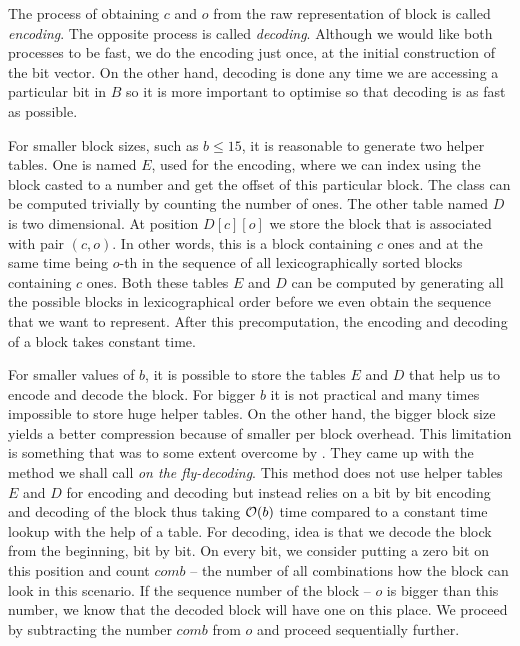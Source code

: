 The process of obtaining $c$ and $o$ from the raw representation of block is called
\textit{encoding}. The opposite process is called \textit{decoding}. Although we would
like both processes to be fast, we do the encoding just once, at the initial construction
of the bit vector. On the other hand, decoding is done any time we are accessing a particular
bit in $B$ so it is more important to optimise so that decoding is as fast as possible.

For smaller block sizes, such as $b\leq 15$, it is reasonable to
generate two helper tables. One is named $E$, used for the encoding, where we can
index using the block casted to a number and get the offset of this particular block.
The class can be computed trivially by counting the number of ones. The other table
named $D$ is two dimensional. At position $D[c][o]$ we store the block that
is associated with pair $(c, o)$. In other words, this is a block containing $c$ ones
and at the same time being $o$-th in the sequence of all lexicographically sorted
blocks containing $c$ ones. Both these tables $E$ and $D$ can be computed
by generating all the possible blocks in lexicographical order before we even
obtain the sequence that we want to represent. After this precomputation,
the encoding and decoding of a block takes constant time.

For smaller values of $b$, it is possible to store the tables $E$ and $D$ that help us
to encode and decode the block. For bigger $b$ it is not practical and many times
impossible to store huge helper tables. On the other hand, the bigger block size yields a
better compression because of smaller per block overhead. This limitation is something that
was to some extent overcome by \cite{navarro2012fast}. They came up with the method we shall
call \textit{on the fly-decoding}. This method does not use helper tables $E$ and $D$ for
encoding and decoding but instead relies on a bit by bit encoding and decoding of the block
thus taking $\mathcal{O}(b)$ time compared to a constant time lookup with the help of a table.
For decoding, idea is that we decode the block from the beginning, bit by bit. On every bit,
we consider putting a zero bit on this position and count $comb$ -- the number of all
combinations how the block can look in this scenario. If the sequence number of the block --
$o$ is bigger than this number, we know that the decoded block will have one on this place.
We proceed by subtracting the number $comb$ from $o$ and proceed sequentially further.

